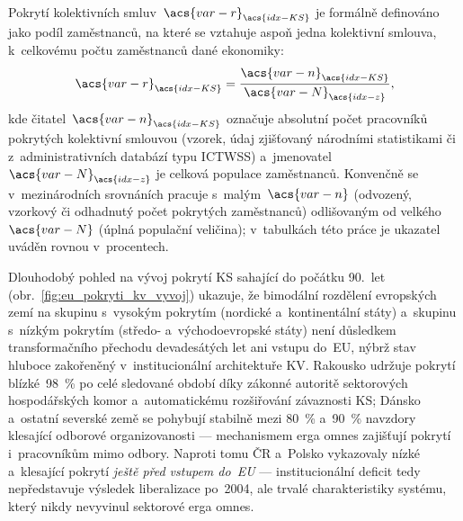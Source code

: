 
Pokrytí kolektivních smluv~$\acs{var-r}_{\acs{idx-KS}}$ je formálně definováno
jako podíl zaměstnanců, na které se vztahuje aspoň jedna kolektivní smlouva,
k~celkovému počtu zaměstnanců dané ekonomiky:
\begin{equation}\label{eq:cb_coverage_rate}
  \acs{var-r}_{\acs{idx-KS}}
    = \frac{\acs{var-n}_{\acs{idx-KS}}}{\acs{var-N}_{\acs{idx-z}}},
\end{equation}
kde čitatel~$\acs{var-n}_{\acs{idx-KS}}$ označuje absolutní počet pracovníků
pokrytých kolektivní smlouvou (vzorek, údaj zjišťovaný národními statistikami
či z~administrativních databází typu \acs{ICTWSS}) a~jmenovatel~$\acs{var-N}_{\acs{idx-z}}$
je celková populace zaměstnanců.
Konvenčně se v~mezinárodních srovnáních pracuje s~malým~$\acs{var-n}$
(odvozený, vzorkový či odhadnutý počet pokrytých zaměstnanců) odlišovaným
od velkého~$\acs{var-N}$ (úplná populační veličina); v~tabulkách této práce je
ukazatel uváděn rovnou v~procentech.

Dlouhodobý pohled na vývoj pokrytí \ac{KS} sahající do počátku 90.~let
(obr.~\ref{fig:eu_pokryti_kv_vyvoj}) ukazuje, že bimodální rozdělení
evropských zemí na skupinu s~vysokým pokrytím (nordické a~kontinentální
státy) a~skupinu s~nízkým pokrytím (středo- a~východoevropské státy) není
důsledkem transformačního přechodu devadesátých let ani vstupu do~\ac{EU},
nýbrž stav hluboce zakořeněný v~institucionální architektuře \ac{KV}.
Rakousko udržuje pokrytí blízké~\SI{98}{\percent} po celé sledované
období díky zákonné autoritě sektorových hospodářských komor a~automatickému
rozšiřování závaznosti \ac{KS}; Dánsko a~ostatní severské země se
pohybují stabilně mezi \SI{80}{\percent} a~\SI{90}{\percent} navzdory klesající
odborové organizovanosti --- mechanismem erga omnes zajišťují pokrytí i~pracovníkům
mimo odbory.
Naproti tomu \ac{ČR} a~Polsko vykazovaly nízké a~klesající pokrytí
\emph{ještě před vstupem do~\ac{EU}} --- institucionální deficit tedy
nepředstavuje výsledek liberalizace po~2004, ale trvalé charakteristiky
systému, který nikdy nevyvinul sektorové erga omnes.



